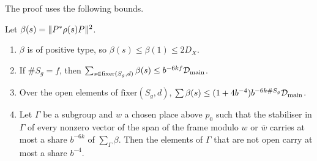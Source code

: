 The proof uses the following bounds.

\begin{lemma}[Fixers]\label{lem:fixers}
Let $\beta(s)=\lVert P^*\rho(s)P\rVert^2$.
\begin{enumerate}[label=\textup{(\alph*)}]
\item $\beta$ is of positive type, so $\beta(s)\le\beta(1)\le2D_X$.
\item If $\#S_g=f$, then $\sum_{s\in\mathrm{fixer}(S_g,d)}\beta(s)\le b^{-6kf}\mathcal D_{\rm main}$.
\item Over the open elements of $\mathrm{fixer}(S_g,d)$, $\sum\beta(s)\le(1+4b^{-4})b^{-6k\#S_g}\mathcal D_{\rm main}$.
\item Let $\Gamma$ be a subgroup and $w$ a chosen place above $p_0$ such that the stabiliser in $\Gamma$ of every nonzero vector of the span of the frame modulo $w$ or $\bar w$ carries at most a share $b^{-6k}$ of $\sum_\Gamma\beta$. Then the elements of $\Gamma$ that are not open carry
at most a share $b^{-4}$.
\end{enumerate}
\end{lemma}

